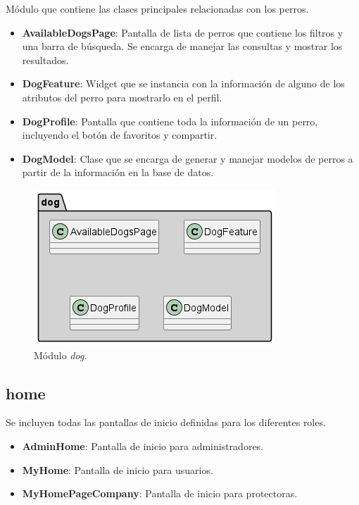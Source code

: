 \documentclass[a4paper, 12pt]{article}
\begin{document}
Módulo que contiene las clases principales relacionadas con los perros.

\begin{itemize}[noitemsep]
	\item \textbf{AvailableDogsPage}: Pantalla de lista de perros que contiene los filtros y una barra de búsqueda. Se encarga de manejar las consultas y mostrar los resultados.
	\item \textbf{DogFeature}: Widget que se instancia con la información de alguno de los atributos del perro para mostrarlo en el perfil.
	\item \textbf{DogProfile}: Pantalla que contiene toda la información de un perro, incluyendo el botón de favoritos y compartir.
	\item \textbf{DogModel}: Clase que se encarga de generar y manejar modelos de perros a partir de la información en la base de datos.
\end{itemize}

\begin{figure}[H]
	\begin{center}
		{\includegraphics[width=0.8\linewidth]{diagram/Dog.png}\par}
		\caption{Módulo  \textit{dog}.}
	\end{center}
\end{figure}


\subsection*{home}

Se incluyen todas las pantallas de inicio definidas para los diferentes roles.

\begin{itemize}[noitemsep]
	\item \textbf{AdminHome}: Pantalla de inicio para administradores.
	\item \textbf{MyHome}: Pantalla de inicio para usuarios.
	\item \textbf{MyHomePageCompany}: Pantalla de inicio para protectoras.
\end{itemize}
\end{document}
